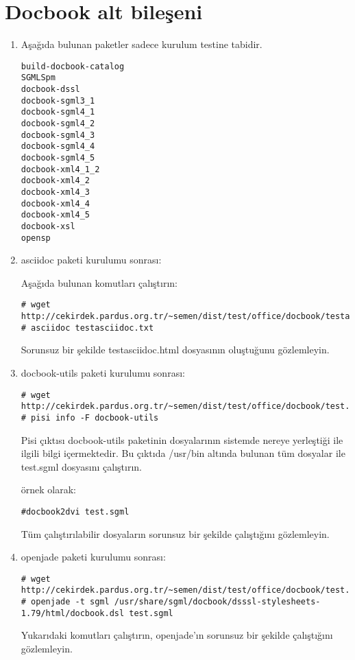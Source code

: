 \documentclass[a4paper,10pt]{article}
\begin{document}
\section{Docbook alt bileşeni}
\begin{enumerate}
 \item Aşağıda bulunan paketler sadece kurulum testine tabidir.
\begin{verbatim}
build-docbook-catalog
SGMLSpm
docbook-dssl
docbook-sgml3_1
docbook-sgml4_1
docbook-sgml4_2
docbook-sgml4_3
docbook-sgml4_4
docbook-sgml4_5
docbook-xml4_1_2
docbook-xml4_2
docbook-xml4_3
docbook-xml4_4
docbook-xml4_5
docbook-xsl
opensp
\end{verbatim}
 \item asciidoc paketi kurulumu sonrası:

Aşağıda bulunan komutları çalıştırın:
\begin{verbatim}
# wget http://cekirdek.pardus.org.tr/~semen/dist/test/office/docbook/testasciidoc.txt
# asciidoc testasciidoc.txt
\end{verbatim}

Sorunsuz bir şekilde testasciidoc.html dosyasının oluştuğunu gözlemleyin.

\item docbook-utils paketi kurulumu sonrası:
\begin{verbatim}
# wget http://cekirdek.pardus.org.tr/~semen/dist/test/office/docbook/test.sgml
# pisi info -F docbook-utils
\end{verbatim}

Pisi çıktısı docbook-utils paketinin dosyalarının sistemde nereye yerleştiği ile ilgili bilgi içermektedir. Bu çıktıda /usr/bin altında bulunan tüm dosyalar ile test.sgml dosyasını çalıştırın.

örnek olarak:
\begin{verbatim}
#docbook2dvi test.sgml
\end{verbatim}

Tüm çalıştırılabilir dosyaların sorunsuz bir şekilde çalıştığını gözlemleyin.

\item openjade paketi kurulumu sonrası:
\begin{verbatim}
# wget http://cekirdek.pardus.org.tr/~semen/dist/test/office/docbook/test.sgml
# openjade -t sgml /usr/share/sgml/docbook/dsssl-stylesheets-1.79/html/docbook.dsl test.sgml
\end{verbatim}

Yukarıdaki komutları çalıştırın, openjade'ın sorunsuz bir şekilde çalıştığını gözlemleyin.


\end{enumerate}
\end{document}
